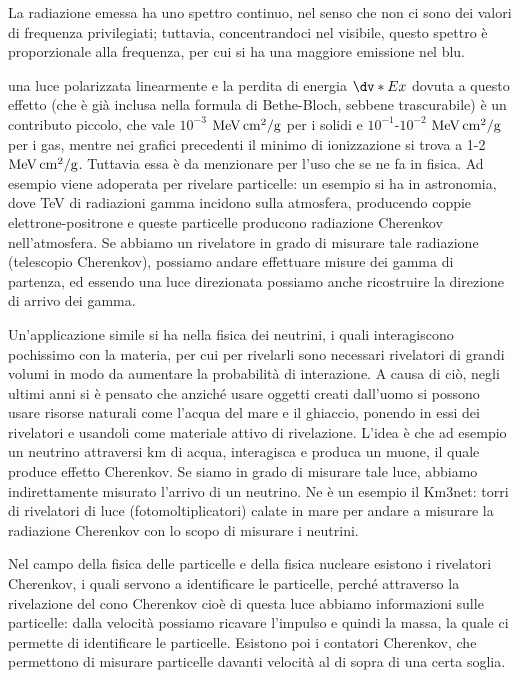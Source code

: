 \vspace{0.2cm}La radiazione emessa ha uno spettro continuo, nel senso che non ci sono dei valori di frequenza privilegiati; tuttavia, concentrandoci nel visibile, questo spettro è proporzionale alla frequenza, per cui si ha una maggiore emissione nel blu.

\E una luce polarizzata linearmente e la perdita di energia $\dv*{E}{x}$ dovuta a questo effetto (che è già inclusa nella formula di Bethe-Bloch, sebbene trascurabile) è un contributo piccolo, che vale $10^{-3}$ $\rm MeV \, cm^2/g$ per i solidi e $10^{-1}$-$10^{-2}$ $\rm MeV \, cm^2/g$ per i gas, mentre nei grafici precedenti il minimo di ionizzazione si trova a 1-2 $\rm MeV \, cm^2/g$. Tuttavia essa è da menzionare per l'uso che se ne fa in fisica. Ad esempio viene adoperata per rivelare particelle: un esempio si ha in astronomia, dove TeV di radiazioni gamma incidono sulla atmosfera, producendo coppie elettrone-positrone e queste particelle producono radiazione Cherenkov nell'atmosfera. Se abbiamo un rivelatore in grado di misurare tale radiazione (telescopio Cherenkov), possiamo andare effettuare misure dei gamma di partenza, ed essendo una luce direzionata possiamo anche ricostruire la direzione di arrivo dei gamma.

Un'applicazione simile si ha nella fisica dei neutrini, i quali interagiscono pochissimo con la materia, per cui per rivelarli sono necessari rivelatori di grandi volumi in modo da aumentare la probabilità di interazione. A causa di ciò, negli ultimi anni si è pensato che anziché usare oggetti creati dall'uomo si possono usare risorse naturali come l'acqua del mare e il ghiaccio, ponendo in essi dei rivelatori e usandoli come materiale attivo di rivelazione. L'idea è che ad esempio un neutrino attraversi km di acqua, interagisca e produca un muone, il quale produce effetto Cherenkov. Se siamo in grado di misurare tale luce, abbiamo indirettamente misurato l'arrivo di un neutrino. Ne è un esempio il Km3net: torri di rivelatori di luce (fotomoltiplicatori) calate in mare per andare a misurare la radiazione Cherenkov con lo scopo di misurare i neutrini.

Nel campo della fisica delle particelle e della fisica nucleare esistono i rivelatori Cherenkov, i quali servono a identificare le particelle, perché attraverso la rivelazione del cono Cherenkov cioè di questa luce abbiamo informazioni sulle particelle: dalla velocità possiamo ricavare l'impulso e quindi la massa, la quale ci permette di identificare le particelle. Esistono poi i contatori Cherenkov, che permettono di misurare particelle davanti velocità al di sopra di una certa soglia.

